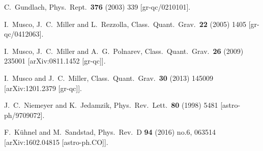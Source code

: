 \begin{thebibliography}{10}
  C.~Gundlach,
  Phys.\ Rept.\  {\bf 376} (2003) 339
  [gr-qc/0210101].


  I.~Musco, J.~C.~Miller and L.~Rezzolla,
  Class.\ Quant.\ Grav.\  {\bf 22} (2005) 1405
  [gr-qc/0412063].


  I.~Musco, J.~C.~Miller and A.~G.~Polnarev,
  Class.\ Quant.\ Grav.\  {\bf 26} (2009) 235001
  [arXiv:0811.1452 [gr-qc]].


  I.~Musco and J.~C.~Miller,
  Class.\ Quant.\ Grav.\  {\bf 30} (2013) 145009
  [arXiv:1201.2379 [gr-qc]].


  J.~C.~Niemeyer and K.~Jedamzik,
  Phys.\ Rev.\ Lett.\  {\bf 80} (1998) 5481
  [astro-ph/9709072].


  F.~Kühnel and M.~Sandstad,
  Phys.\ Rev.\ D {\bf 94} (2016) no.6,  063514
  [arXiv:1602.04815 [astro-ph.CO]].


\end{thebibliography}